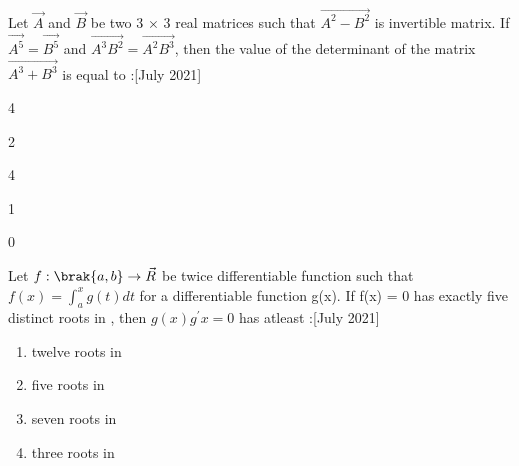 	\item Let $\vec{A}$ and $\vec{B}$ be two 3 $\times$ 3 real matrices such that $\vec{A^2 - B^2}$ is invertible matrix. If $\vec{A^5} = \vec{B^5}$ and $\vec{A^3B^2} = \vec{A^2B^3}$, then the value of the determinant of the matrix $\vec{A^3 + B^3}$ is equal to :\hfill{[July 2021]}
		\begin{enumerate}
		\end{enumerate}
	\item Let $ f : \brak{a,b} \to \vec{R}$ be twice differentiable function such that $ f(x) = \int_{a}^{x} g(t) dt$ for a differentiable function g(x). If f(x) = 0 has exactly five distinct roots in , then $g(x)g^{\prime}{x} = 0$ has atleast :\hfill{[July 2021]}
		\begin{enumerate}
			\item twelve roots in \brak{a,b}
			\item five roots in \brak{a,b}
			\item seven roots in \brak{a,b}
			\item three roots in \brak{a,b}
		\end{enumerate}
%
